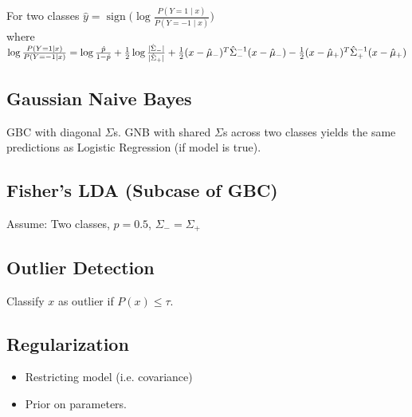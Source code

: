 For two classes $\hat{y} = \operatorname{sign}\Big(\log\frac{P(Y=1\mid x)}{P(Y=-1\mid x)}\Big) $ 
\\ where  
$    \log\frac{P(Y=1\mid x)}{P(Y=-1\mid x)} = \log \frac{\hat{p}}{1-\hat{p}} + \frac{1}{2}\log \frac{|\hat{\Sigma}_-|}{|\hat{\Sigma}_+|}\\
    + \frac{1}{2}(x - \hat{\mu}_-)^T \hat{\Sigma}_-^{-1} (x - \hat{\mu}_-) - \frac{1}{2}(x - \hat{\mu}_+)^T \hat{\Sigma}_+^{-1} (x - \hat{\mu}_+)$

\subsection*{Gaussian Naive Bayes}
GBC with diagonal $\Sigma$s. GNB with shared $\Sigma$s across
two classes yields the same predictions as Logistic Regression
(if model is true).

\subsection*{Fisher's LDA (Subcase of GBC)}
Assume: Two classes, $p = 0.5$, ${\Sigma}_- = {\Sigma}_+ $

\subsection*{Outlier Detection}
Classify $x$ as outlier if $P(x) \leq \tau$.

\subsection*{Regularization}
\begin{itemize}[noitemsep,leftmargin=6mm,topsep=0pt,parsep=0pt,partopsep=0pt]
    \item Restricting model (i.e. covariance)
    \item Prior on parameters.\\
\end{itemize}
